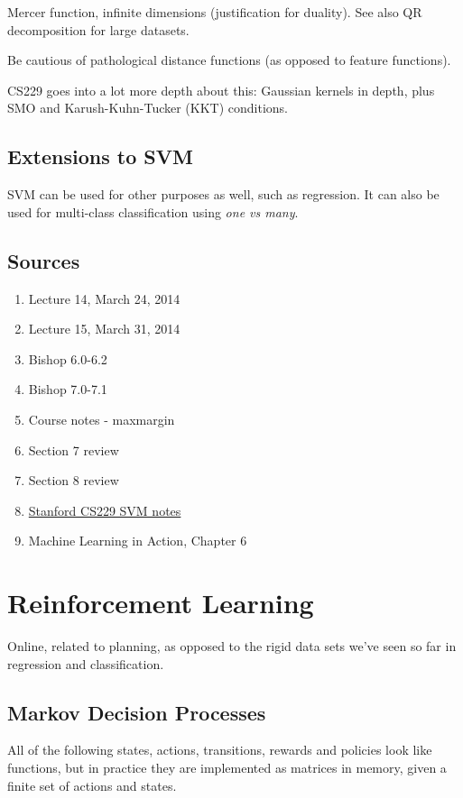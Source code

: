 \documentclass[11pt, oneside]{article}   	%
\begin{document}
Mercer function, infinite dimensions (justification for duality). See also QR decomposition for large datasets.

Be cautious of pathological distance functions (as opposed to feature functions).

CS229 goes into a lot more depth about this: Gaussian kernels in depth, plus SMO and Karush-Kuhn-Tucker (KKT) conditions.

\subsection{Extensions to SVM}

SVM can be used for other purposes as well, such as regression. It can also be used for multi-class classification using \emph{one vs many}.

\subsection{Sources}

\begin{enumerate}
	\item Lecture 14, March 24, 2014
	\item Lecture 15, March 31, 2014
	\item Bishop 6.0-6.2 
	\item Bishop 7.0-7.1
	\item Course notes - maxmargin
	\item Section 7 review
	\item Section 8 review
	\item \href{http://cs229.stanford.edu/notes/cs229-notes3.pdf}{Stanford CS229 SVM notes}
	\item Machine Learning in Action, Chapter 6
\end{enumerate}

\section{Reinforcement Learning}

Online, related to planning, as opposed to the rigid data sets we've seen so far in regression and classification.

\subsection{Markov Decision Processes}

All of the following states, actions, transitions, rewards and policies look like functions, but in practice they are implemented as matrices in memory, given a finite set of actions and states.
\end{document}
